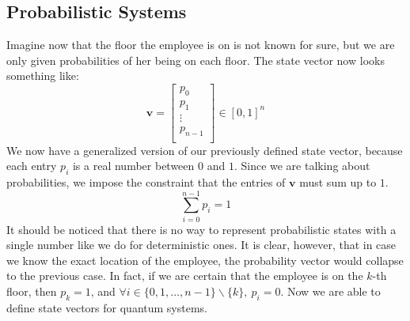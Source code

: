 \documentclass[12pt,a4paper]{report}
\theoremstyle{definition}
\theoremstyle{definition}
\theoremstyle{definition}
\begin{document}
\subsection{Probabilistic Systems}
Imagine now that the floor the employee is on is not known for sure, but we are only given probabilities of her being on each floor. The state vector now looks something like:
\begin{equation*}
    \mathbf{v}=\begin{bmatrix}
        p_0\\
        p_1\\
        \vdots\\
        p_{n-1}\\
    \end{bmatrix}\in [0,1]^n
\end{equation*}
We now have a generalized version of our previously defined state vector, because each entry $p_i$ is a real number between $0$ and $1$. Since we are talking about probabilities, we impose the constraint that the entries of $\mathbf{v}$ must sum up to $1$.
\begin{equation*}
    \sum_{i=0}^{n-1} p_i = 1
\end{equation*}
It should be noticed that there is no way to represent probabilistic states with a single number like we do for deterministic ones. It is clear, however, that in case we know the exact location of the employee, the probability vector would collapse to the previous case. In fact, if we are certain that the employee is on the $k$-th floor, then $p_k=1$, and $\forall i \in \{0,1,\ldots,n-1\} \smallsetminus \{k\},\ p_i=0$. Now we are able to define state vectors for quantum systems.
\end{document}
